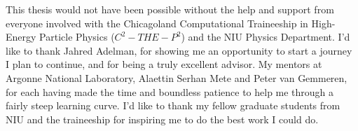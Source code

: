 This thesis would not have been possible without the help and support from everyone involved with the Chicagoland Computational Traineeship in High-Energy Particle Physics ($C^{2}-THE-P^{2}$) and the NIU Physics Department.
I'd like to thank Jahred Adelman, for showing me an opportunity to start a journey I plan to continue, and for being a truly excellent advisor.
My mentors at Argonne National Laboratory, Alaettin Serhan Mete and Peter van Gemmeren, for each having made the time and boundless patience to help me through a fairly steep learning curve.
I'd like to thank my fellow graduate students from NIU and the traineeship for inspiring me to do the best work I could do.